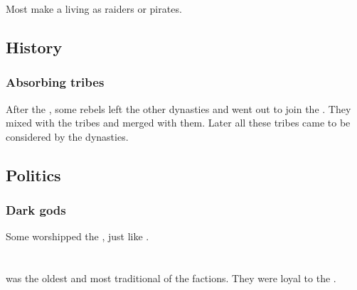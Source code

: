 Most \daemoniacs make a living as raiders or pirates.









\subsection{History}





\subsubsection{Absorbing tribes}
After the , some \Baelzerach{} rebels left the other dynasties and went out to join the . 
They mixed with the tribes and merged with them. 
Later all these tribes came to be considered \Baelzerach{} by the dynasties. 









\subsection{Politics}





\subsubsection{Dark gods}
Some \Baelzerach{} worshipped the , just like . 















\section{\CiriathSepher}
\index{\CiriathSepher}
\KiriathSepher{} was the oldest and most traditional of the \resphan{} factions. 
They were loyal to the \banes. 

